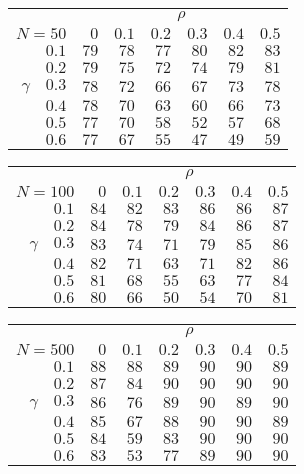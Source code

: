 \begin{tabular}{r|rrrrrr}
\hline\hline
 &\multicolumn{6}{c}{$\rho$} \\ 
 $N = 50$ & $0$ & $0.1$ & $0.2$ & $0.3$ & $0.4$ & $0.5$ \\ 
 \hline$0.1$ & $79$ & $78$ & $77$ & $80$ & $82$ & $83$\\ 
$0.2$ & $79$ & $75$ & $72$ & $74$ & $79$ & $81$\\ 
$\gamma\quad$$0.3$ & $78$ & $72$ & $66$ & $67$ & $73$ & $78$\\ 
$0.4$ & $78$ & $70$ & $63$ & $60$ & $66$ & $73$\\ 
$0.5$ & $77$ & $70$ & $58$ & $52$ & $57$ & $68$\\ 
$0.6$ & $77$ & $67$ & $55$ & $47$ & $49$ & $59$\\ 
 \hline 
 \end{tabular}
 
 \vspace{2em} 
 
\begin{tabular}{r|rrrrrr}
\hline\hline
 &\multicolumn{6}{c}{$\rho$} \\ 
 $N = 100$ & $0$ & $0.1$ & $0.2$ & $0.3$ & $0.4$ & $0.5$ \\ 
 \hline$0.1$ & $84$ & $82$ & $83$ & $86$ & $86$ & $87$\\ 
$0.2$ & $84$ & $78$ & $79$ & $84$ & $86$ & $87$\\ 
$\gamma\quad$$0.3$ & $83$ & $74$ & $71$ & $79$ & $85$ & $86$\\ 
$0.4$ & $82$ & $71$ & $63$ & $71$ & $82$ & $86$\\ 
$0.5$ & $81$ & $68$ & $55$ & $63$ & $77$ & $84$\\ 
$0.6$ & $80$ & $66$ & $50$ & $54$ & $70$ & $81$\\ 
 \hline 
 \end{tabular}
 
 \vspace{2em} 
 
\begin{tabular}{r|rrrrrr}
\hline\hline
 &\multicolumn{6}{c}{$\rho$} \\ 
 $N = 500$ & $0$ & $0.1$ & $0.2$ & $0.3$ & $0.4$ & $0.5$ \\ 
 \hline$0.1$ & $88$ & $88$ & $89$ & $90$ & $90$ & $89$\\ 
$0.2$ & $87$ & $84$ & $90$ & $90$ & $90$ & $90$\\ 
$\gamma\quad$$0.3$ & $86$ & $76$ & $89$ & $90$ & $89$ & $90$\\ 
$0.4$ & $85$ & $67$ & $88$ & $90$ & $90$ & $89$\\ 
$0.5$ & $84$ & $59$ & $83$ & $90$ & $90$ & $90$\\ 
$0.6$ & $83$ & $53$ & $77$ & $89$ & $90$ & $90$\\ 
 \hline 
 \end{tabular}